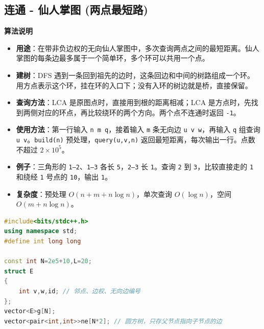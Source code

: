 \documentclass[10pt,landscape,a4paper]{article}
\begin{document}
\begin{multicols*}{3}
\subsection*{连通 - 仙人掌图 (两点最短路)}
\par\addvspace{0.7ex}\noindent\textbf{算法说明}\par\nobreak
\begin{itemize}
\item \textbf{用途}：在带非负边权的无向仙人掌图中，多次查询两点之间的最短距离。仙人掌图的每条边最多属于一个简单环，多个环可以共用一个点。
\item \textbf{建树}：DFS 遇到一条回到祖先的边时，这条回边和中间的树路组成一个环。用方点表示这个环，挂在环的入口下；没有入环的树边就是桥，直接保留。
\item \textbf{查询方法}：LCA 是原图点时，直接用到根的距离相减；LCA 是方点时，先找到两侧对应的环点，再比较绕环的两个方向。两个点不连通时返回 \texttt{-\allowbreak{}1}。
\item \textbf{使用方法}：第一行输入 \texttt{n\allowbreak{} \allowbreak{}m\allowbreak{} \allowbreak{}q}，接着输入 \texttt{m} 条无向边 \texttt{u\allowbreak{} \allowbreak{}v\allowbreak{} \allowbreak{}w}，再输入 \texttt{q} 组查询 \texttt{u\allowbreak{} \allowbreak{}v}。\texttt{b\allowbreak{}u\allowbreak{}i\allowbreak{}l\allowbreak{}d\allowbreak{}(\allowbreak{}n\allowbreak{})} 预处理，\texttt{q\allowbreak{}u\allowbreak{}e\allowbreak{}r\allowbreak{}y\allowbreak{}(\allowbreak{}u\allowbreak{},\allowbreak{}v\allowbreak{},\allowbreak{}n\allowbreak{})} 返回最短距离，每次输出一行。点数不超过 $2\times10^5$。
\item \textbf{例子}：三角形的 \texttt{1\allowbreak{}—\allowbreak{}2}、\texttt{1\allowbreak{}—\allowbreak{}3} 各长 \texttt{5}，\texttt{2\allowbreak{}—\allowbreak{}3} 长 \texttt{1}。查询 \texttt{2} 到 \texttt{3}，比较直接走的 \texttt{1} 和绕经 \texttt{1} 号点的 \texttt{1\allowbreak{}0}，输出 \texttt{1}。
\item \textbf{复杂度}：预处理 $O(n+m+n\log n)$，单次查询 $O(\log n)$，空间 $O(m+n\log n)$。
\end{itemize}
\par{}\par
\begin{lstlisting}[language=C++]
#include<bits/stdc++.h>
using namespace std;
#define int long long

const int N=2e5+10,L=20;
struct E
{
    int v,w,id; // 邻点、边权、无向边编号
};
vector<E>g[N];
vector<pair<int,int>>ne[N*2]; // 圆方树，只存父节点指向子节点的边


\end{lstlisting}
\end{multicols*}
\end{document}
